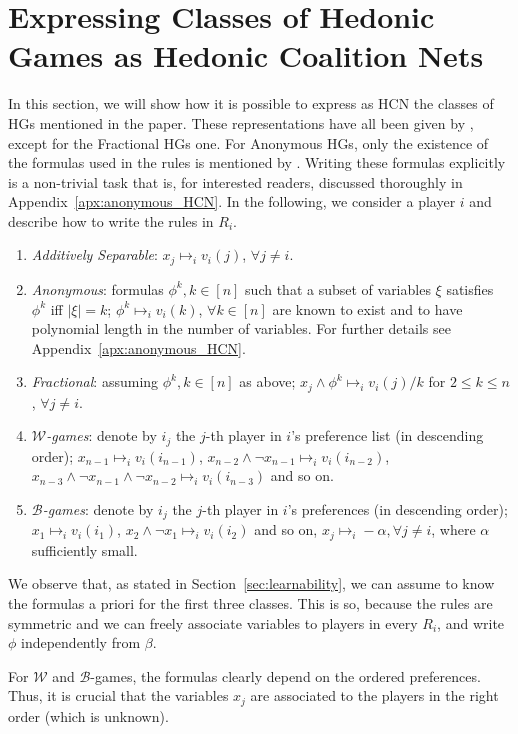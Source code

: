 \documentclass[letterpaper]{article} %
\newcommand{\modulus}[1]{\vert #1 \vert}
\newcommand{\W}{\ensuremath{\mathcal{W}}}
\begin{document}
\section{Expressing Classes of Hedonic Games as Hedonic Coalition Nets}\label{apx:hcn_representations}
In this section, we will show how it is possible to express as HCN the classes of HGs mentioned in the paper. These representations have all been given by \citet{Elkind09}, except for the Fractional HGs one. For Anonymous HGs, only the existence of the formulas used in the rules is mentioned by \citet{Elkind09}. Writing these formulas explicitly is a non-trivial task that is, for interested readers, discussed thoroughly in Appendix~\ref{apx:anonymous_HCN}.
%
In the following, we consider a player $i$ and describe how to write the rules in $R_i$.
%
\begin{enumerate}
    \item \emph{Additively Separable}: $x_j \mapsto_i v_i(j)$, $\forall j \neq i$.
    \item \emph{Anonymous}: formulas $\phi^k, k\in[n]$ such that a subset of variables $\xi$ satisfies $\phi^k$ iff $\modulus{\xi} = k$; $\phi^k \mapsto_i v_i(k)$, $\forall k\in [n]$ are known to exist and to have polynomial length in the number of variables. For further details see Appendix~\ref{apx:anonymous_HCN}.
    \item \emph{Fractional}: assuming $\phi^k, k\in [n]$ as above; $x_j \wedge \phi^k \mapsto_i v_i(j)/k$ for $2\leq k \leq n$, $\forall j\neq i$.
    \item \emph{$\W$-games}: denote by $i_{j}$ the $j$-th player in $i$'s preference list (in descending order); $x_{n-1} \mapsto_i v_i(i_{n-1})$, $x_{n-2} \wedge \neg x_{n-1}  \mapsto_i v_i(i_{n-2})$, $x_{n-3} \wedge \neg x_{n-1} \wedge \neg x_{n-2}  \mapsto_i v_i(i_{n-3})$ and so on.
    \item \emph{$\mathcal{B}$-games}: denote by $i_{j}$ the $j$-th player in $i$'s preferences (in descending order); $x_1 \mapsto_i v_i(i_1)$, $x_2 \wedge \neg x_1  \mapsto_i v_i(i_2)$ and so on, $x_j \mapsto_i -\alpha, \forall j\neq i$, where $\alpha$ sufficiently small.
\end{enumerate}
%
We observe that, as stated in Section~\ref{sec:learnability}, we can assume to know the formulas a priori for the first three classes. This is so, because the rules are symmetric and we can freely associate variables to players in every $R_i$, and write $\phi$ independently from $\beta$. 

For $\W$ and $\mathcal{B}$-games, the formulas clearly depend on the ordered preferences. Thus, it is crucial that the variables $x_j$ are associated to the players in the right order (which is unknown).
%
\end{document}
